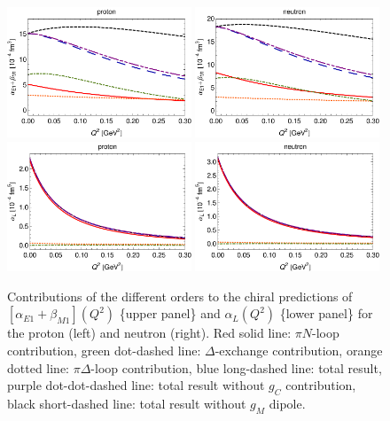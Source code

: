 \documentclass[12pt,preprint,tightenlines,
showpacs,preprintnumbers,amsmath,amssymb,
a4paper,nofootinbib]{revtex4-2}
\begin{document}
\begin{figure}
\begin{center}
 \includegraphics[width=0.49\textwidth]{alpha+beta_p-orders-Dip.pdf}
  \includegraphics[width=0.49\textwidth]{alpha+beta_n-orders-Dip.pdf}\\[0.2cm]
   \includegraphics[width=0.49\textwidth]{alphaL_p-orders-Dip.pdf}
    \includegraphics[width=0.49\textwidth]{alphaL_n-orders-Dip.pdf}
\caption{\small{Contributions of the different orders to the chiral predictions of $[\alpha_{E1}+\beta_{M1}](Q^2)$ \{upper panel\} and $\alpha_L(Q^2)$ \{lower panel\} for the proton (left) and neutron (right). Red solid line: $\pi N$-loop contribution, green dot-dashed line: $\Delta$-exchange contribution, orange dotted line: $\pi \Delta$-loop contribution, blue long-dashed line: total result, purple dot-dot-dashed line: total result without $g_C$ contribution, black short-dashed line: total result without $g_M$ dipole.}}\label{Fig:alpha+beta-orders}
\end{center}
\end{figure}
\end{document}
